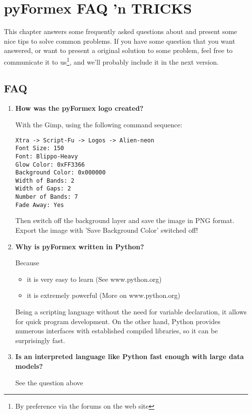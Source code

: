 
\chapter{pyFormex FAQ 'n TRICKS}
\label{cha:faq}
\def\faq#1{\item\textbf{#1}\par}
\def\trick#1{\item\textbf{#1}\par}

This chapter answers some frequently asked questions about \pyformex and present some nice tips to solve common problems. If you have some question that you want answered, or want to present a original solution to some problem, feel free to communicate it to us\footnote{By preference via the forums on the \pyformex web site}, and we'll probably include it in the next version.  

\section{FAQ}
\label{Sec:faq}
\begin{enumerate}

\faq{How was the pyFormex logo created?}
With the Gimp, using the following command sequence: 
\begin{verbatim}
Xtra -> Script-Fu -> Logos -> Alien-neon
Font Size: 150 
Font: Blippo-Heavy
Glow Color: 0xFF3366
Background Color: 0x000000
Width of Bands: 2
Width of Gaps: 2
Number of Bands: 7
Fade Away: Yes
\end{verbatim}
Then switch off the background layer and save the image in PNG format.
Export the image with 'Save Background Color' switched off!



\faq{Why is pyFormex written in Python?}
Because
\begin{itemize}
\item it is very easy to learn (See www.python.org)
\item it is extremely powerful (More on www.python.org)
\end{itemize}

Being a scripting language without the need for variable declaration, it allows for quick program development.
On the other hand, Python provides numerous interfaces with established compiled libraries, so it can be surprisingly fast.


\faq{Is an interpreted language like Python fast enough with large data models?}
See the question above


\end{enumerate}


